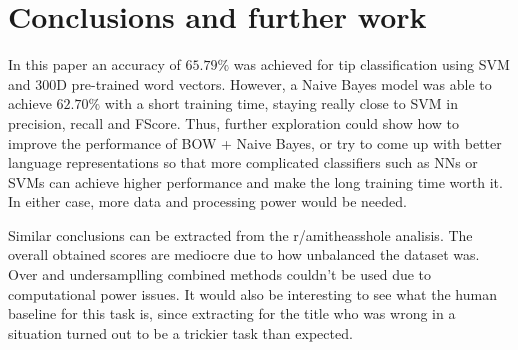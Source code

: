 \documentclass[11pt,a4paper]{article}
\begin{document}
\section{Conclusions and further work}
\label{sec:conclusions}

In this paper an accuracy of $65.79\%$ was achieved for tip classification using SVM
and $300$D pre-trained word vectors. However, a Naive Bayes model was able to
achieve $62.70\%$ with a short training time, staying really close to SVM in precision,
recall and FScore. Thus, further exploration could show how
to improve the performance of BOW + Naive Bayes, or try to come up with better
language representations so that more complicated classifiers such as NNs
or SVMs can achieve higher performance and make the long training time worth it.\\
In either case, more data and processing power would be needed.

Similar conclusions can be extracted from the r/amitheasshole analisis. The overall obtained scores are mediocre due to how unbalanced the dataset was. Over and undersamplling combined methods couldn't be used due to computational power issues. It would also be interesting to see what the human baseline for this task is, since extracting for the title who was wrong in a situation turned out to be a trickier task than expected.

\nocite{*}



\appendix
\end{document}

